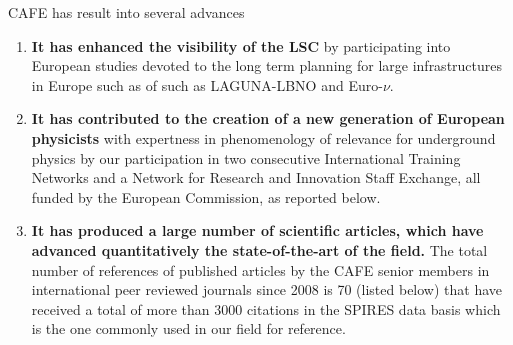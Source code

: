 CAFE has result into several advances
\begin{enumerate}
\item {\bf It has enhanced the visibility of the LSC} by participating into
European studies devoted to the long term planning for large infrastructures
in Europe such as of such as LAGUNA-LBNO and Euro-$\nu$.
\item {\bf It has contributed to the  creation of a new generation of European physicists}
with expertness in phenomenology of relevance for underground physics
by our participation in two consecutive International Training Networks
and a Network for Research and Innovation Staff Exchange, all
funded by the European Commission, as reported below. 
\item  {\bf It has  produced a large number of scientific articles, which have
advanced quantitatively the state-of-the-art of the field.} The total
number of references of published articles by the CAFE senior members
in international peer reviewed journals 
since 2008 is 70  (listed below) that  have  received a total of 
more than 3000 citations in the SPIRES data basis which is the one commonly used
in our field for reference.
\end{enumerate}


